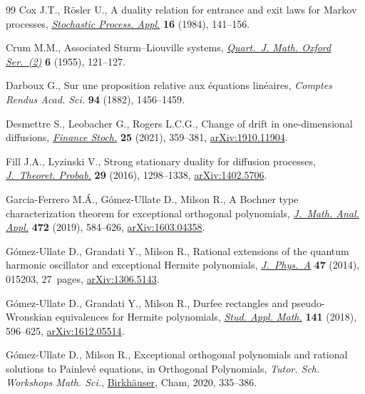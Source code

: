 \documentclass[pdftex]{sigma}
\numberwithin{equation}{section}
\theoremstyle{definition}
\def\i{{\textnormal i}}
\begin{document}
\begin{thebibliography}{99}
Cox J.T., R\"osler U., A duality relation for entrance and exit laws for
 {M}arkov processes,
 \href{https://doi.org/10.1016/0304-4149(84)90015-2}{\textit{Stochastic
 Process. Appl.}} \textbf{16} (1984), 141--156.

Crum M.M., Associated {S}turm--{L}iouville systems,
 \href{https://doi.org/10.1093/qmath/6.1.121}{\textit{Quart.~J. Math. Oxford
 Ser.~(2)}} \textbf{6} (1955), 121--127.

Darboux G., Sur une proposition relative aux \'equations lin\'eaires,
 \textit{Comptes Rendus Acad. Sci.} \textbf{94} (1882), 1456--1459.

Desmettre S., Leobacher G., Rogers L.C.G., Change of drift in one-dimensional
 diffusions, \href{https://doi.org/10.1007/s00780-021-00451-w}{\textit{Finance
 Stoch.}} \textbf{25} (2021), 359--381,
 \href{http://arxiv.org/abs/1910.11904}{arXiv:1910.11904}.

Fill J.A., Lyzinski V., Strong stationary duality for diffusion processes,
 \href{https://doi.org/10.1007/s10959-015-0612-1}{\textit{J.~Theoret.
 Probab.}} \textbf{29} (2016), 1298--1338,
 \href{http://arxiv.org/abs/1402.5706}{arXiv:1402.5706}.

Garc\'{\i}a-Ferrero M.{\'A}., G\'omez-Ullate D., Milson R., A {B}ochner type
 characterization theorem for exceptional orthogonal polynomials,
 \href{https://doi.org/10.1016/j.jmaa.2018.11.042}{\textit{J.~Math. Anal.
 Appl.}} \textbf{472} (2019), 584--626,
 \href{http://arxiv.org/abs/1603.04358}{arXiv:1603.04358}.

G\'omez-Ullate D., Grandati Y., Milson R., Rational extensions of the quantum
 harmonic oscillator and exceptional {H}ermite polynomials,
 \href{https://doi.org/10.1088/1751-8113/47/1/015203}{\textit{J.~Phys.~A}}
 \textbf{47} (2014), 015203, 27~pages,
 \href{http://arxiv.org/abs/1306.5143}{arXiv:1306.5143}.

G\'omez-Ullate D., Grandati Y., Milson R., Durfee rectangles and
 pseudo-{W}ronskian equivalences for {H}ermite polynomials,
 \href{https://doi.org/10.1111/sapm.12225}{\textit{Stud. Appl. Math.}}
 \textbf{141} (2018), 596--625,
 \href{http://arxiv.org/abs/1612.05514}{arXiv:1612.05514}.

G\'omez-Ullate D., Milson R., Exceptional orthogonal polynomials and rational
 solutions to {P}ainlev\'e equations, in Orthogonal {P}olynomials, \textit{Tutor. Sch. Workshops Math. Sci.},
 \href{https://doi.org/10.1007/978-3-030-36744-2_15}{Birkh\"auser}, Cham,
 2020, 335--386.


\end{thebibliography}
\end{document}

